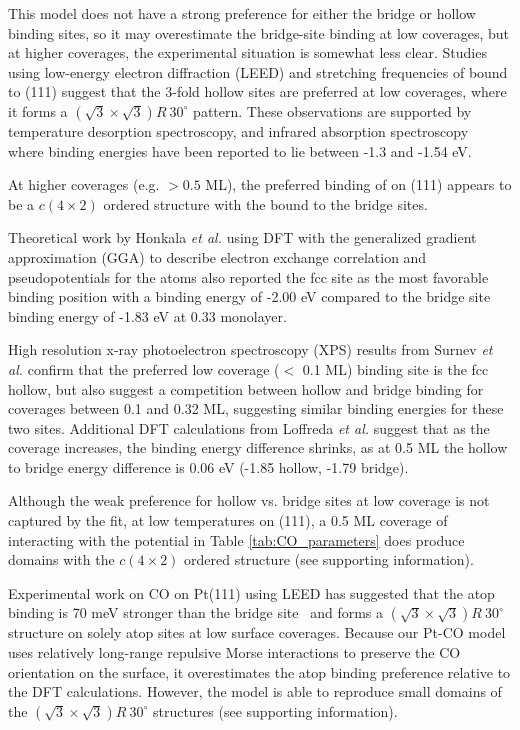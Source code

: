 This  model does not have a strong preference for
either the bridge or hollow binding sites, so it may overestimate the
bridge-site binding at low coverages, but at higher coverages, the
experimental situation is somewhat less clear.\citep{Wong:1991ta}
Studies using low-energy electron diffraction (LEED) and
 stretching frequencies of  bound to
(111) suggest that the 3-fold hollow sites are preferred at low
coverages,\citep{Bradshaw:1978uf,Conrad:1978fx,Ohtani:1987zh} where it
forms a $(\sqrt{3} \times \sqrt{3}) R~30^{\circ}$ pattern.  These
observations are supported by temperature desorption
spectroscopy,\citep{Guo:1989} and infrared absorption
spectroscopy~\citep{Szanyi:1992} where binding energies have been
reported to lie between -1.3 and -1.54 eV.

At higher  coverages (e.g. $> 0.5$ ML), the preferred binding
of  on (111) appears to be a $c(4\times2)$ ordered
structure with the  bound to the bridge
sites.\citep{Bradshaw:1978uf} 

Theoretical work by Honkala \textit{et al.}\citep{Honkala:2001sf} using
DFT with the generalized gradient approximation (GGA) to describe
electron exchange correlation and pseudopotentials for the 
atoms also reported the fcc site as the most favorable binding
position with a binding energy of -2.00 eV compared to the bridge site
binding energy of -1.83 eV at 0.33 monolayer.

High resolution x-ray photoelectron spectroscopy (XPS) results from
Surnev \textit{et al.}\citep{Surnev:2000uk} confirm that the preferred
low coverage ($< $ 0.1 ML) binding site is the fcc hollow, but also
suggest a competition between hollow and bridge binding for coverages
between 0.1 and 0.32 ML, suggesting similar binding energies for these
two sites. Additional DFT calculations from Loffreda \textit{et
al.}\citep{Loffreda:1999vl} suggest that as the coverage increases, the
binding energy difference shrinks, as at 0.5 ML the hollow to bridge
energy difference is 0.06 eV (-1.85 hollow, -1.79 bridge).

Although the weak preference for hollow vs. bridge sites at low
coverage is not captured by the  fit, at low
temperatures on (111), a 0.5 ML coverage of  interacting
with the potential in Table \ref{tab:CO_parameters} does produce
domains with the $c(4\times2)$ ordered structure (see supporting
information).

Experimental work on CO on Pt(111) using LEED has suggested that the
atop binding is 70 meV stronger than the bridge
site~\citep{Schweizer:1989fk} and forms a
$(\sqrt{3} \times \sqrt{3}) R~30^{\circ}$ structure on solely atop
sites at low surface coverages.\citep{Kelemen:1979} Because our Pt-CO
model uses relatively long-range repulsive Morse interactions to
preserve the CO orientation on the surface, it overestimates the atop
binding preference relative to the DFT calculations.  However, the
model is able to reproduce small domains of the
$(\sqrt{3} \times \sqrt{3}) R~30^{\circ}$ structures (see supporting
information).

